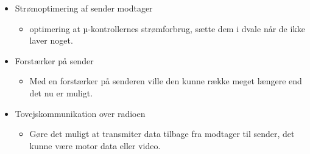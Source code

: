 \documentclass[Main]{subfiles}
\begin{document}
\begin{itemize}
\item Strømoptimering af sender modtager
\vspace{-10pt}
	\begin{itemize}
	\item optimering at µ-kontrollernes strømforbrug, sætte dem i dvale når de ikke laver noget.
	\end{itemize}

\item Forstærker på sender
\vspace{-10pt}
	\begin{itemize}
	\item Med en forstærker på senderen ville den kunne række meget længere end det nu er muligt.
	\end{itemize}
	
\item Tovejskommunikation over radioen
\vspace{-10pt}
	\begin{itemize}
	\item Gøre det muligt at transmiter data tilbage fra modtager til sender, det kunne være motor data eller video.
	\end{itemize}	
	

\end{itemize}
\end{document}
